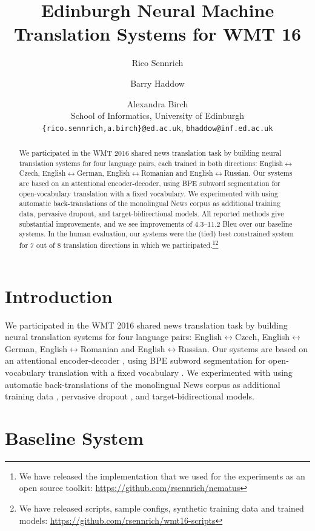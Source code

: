 \documentclass[11pt]{article}
\title{Edinburgh Neural Machine Translation Systems for WMT 16}
\author{
Rico Sennrich\and Barry Haddow \and Alexandra Birch\\
School of Informatics, University of Edinburgh\\
{\tt \{rico.sennrich,a.birch\}@ed.ac.uk}, {\tt bhaddow@inf.ed.ac.uk}
}
\date{}
\begin{document}
\maketitle
\begin{abstract}

We participated in the WMT 2016 shared news translation task by building neural translation systems for four language pairs, each trained in both directions:
English$\leftrightarrow$Czech, English$\leftrightarrow$German, English$\leftrightarrow$Romanian and English$\leftrightarrow$Russian.
Our systems are based on an attentional encoder-decoder,
using BPE subword segmentation for open-vocabulary translation with a fixed vocabulary.
We experimented with using automatic back-translations of the monolingual News corpus as additional training data,
pervasive dropout, and target-bidirectional models.
All reported methods give substantial improvements, and we see improvements of 4.3--11.2 {\sc Bleu} over our baseline systems.
In the human evaluation, our systems were the (tied) best constrained system for 7 out of 8 translation directions in which we participated.\footnote{We have released the implementation that we used for the experiments as an open source toolkit: \url{https://github.com/rsennrich/nematus}}\footnote{We have released scripts, sample configs, synthetic training data and trained models: \url{https://github.com/rsennrich/wmt16-scripts}}

\end{abstract}

\section{Introduction}

We participated in the WMT 2016 shared news translation task by building neural translation systems for four language pairs:
English$\leftrightarrow$Czech, English$\leftrightarrow$German, English$\leftrightarrow$Romanian and English$\leftrightarrow$Russian.
Our systems are based on an attentional encoder-decoder \cite{DBLP:journals/corr/BahdanauCB14},
using BPE subword segmentation for open-vocabulary translation with a fixed vocabulary \cite{DBLP:journals/corr/SennrichHB15}.
We experimented with using automatic back-translations of the monolingual News corpus as additional training data \cite{2015arXiv151106709S},
pervasive dropout \cite{2015arXiv151205287G}, and target-bidirectional models.


\section{Baseline System}
\end{document}
